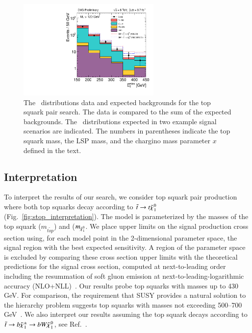 \begin{figure}
\centering
\includegraphics[width=7cm,clip]{HCPPlots/stopmet.pdf}
\caption{The \met\ distributions data and expected backgrounds for the top squark pair search. The data is compared to the sum of the 
expected backgrounds. The \met\ distributions expected in two example signal scenarios are indicated. The numbers in parentheses
indicate the top squark mass, the LSP mass, and the chargino mass parameter $x$ defined in the text.}
\label{fig:stop}       %
\end{figure}

\subsection{Interpretation}


To interpret the results of our search, we consider top squark pair production where both top squarks decay according to $\tilde{t}\to t\tilde{\chi}_{1}^{0}$
(Fig.~\ref{fig:stop_interpretation}).
The model is parameterized by the masses of the top squark ($m_{\tilde{top}}$) and \lsp ($m_{\tilde{\chi}_{1}^{0}}$. We place upper limits on the signal
production cross section using, for each model point in the 2-dimensional parameter space, the signal region with the best expected
sensitivity. A region of the parameter space is excluded by comparing these cross section upper limits with the theoretical predictions 
for the signal cross section, computed at next-to-leading order including the resummation of soft gluon emission at next-to-leading-logarithmic
accuracy (NLO+NLL)~\cite{ref:nlonll}. Our results probe top squarks with masses up to 430 GeV. For comparison, the requirement that SUSY
provides a natural solution to the hierarchy problem suggests top squarks with masses not exceeding 500--700 GeV~\cite{ref:naturalsusy}.
We also interpret our results assuming the top squark decays according to $\tilde{t}\to b\tilde{\chi}_{1}^{\pm}\to b W \tilde{\chi}_{1}^{0}$, see Ref.~\cite{ref:stop}.

